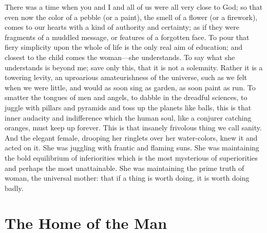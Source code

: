 \documentclass{book}
\begin{document}
There was a time when you and I and all of us were all very close to God; so that even now the color of a pebble (or a paint), the smell of a flower (or a firework), comes to our hearts with a kind of authority and certainty; as if they were fragments of a muddled message, or features of a forgotten face. To pour that fiery simplicity upon the whole of life is the only real aim of education; and closest to the child comes the woman—she understands. To say what she understands is beyond me; save only this, that it is not a solemnity. Rather it is a towering levity, an uproarious amateurishness of the universe, such as we felt when we were little, and would as soon sing as garden, as soon paint as run. To smatter the tongues of men and angels, to dabble in the dreadful sciences, to juggle with pillars and pyramids and toss up the planets like balls, this is that inner audacity and indifference which the human soul, like a conjurer catching oranges, must keep up forever. This is that insanely frivolous thing we call sanity. And the elegant female, drooping her ringlets over her water-colors, knew it and acted on it. She was juggling with frantic and flaming suns. She was maintaining the bold equilibrium of inferiorities which is the most mysterious of superiorities and perhaps the most unattainable. She was maintaining the prime truth of woman, the universal mother: that if a thing is worth doing, it is worth doing badly.

\setcounter{chapter}{0}\part{The Home of the Man}
\label{chapter-46}
\end{document}
